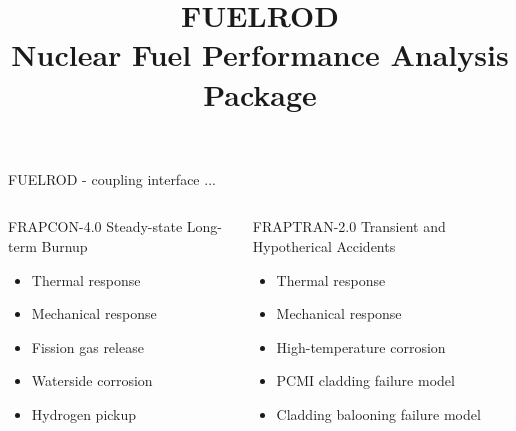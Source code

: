 \documentclass[11pt]{beamer}
\title{FUELROD \\ Nuclear Fuel Performance Analysis Package}
\institute{UNIST Core}
\begin{document}
\titlepage

\begin{frame}{FUELROD}
\scriptsize
   - coupling interface ...

  \begin{columns}


  \begin{block}{FRAPCON-4.0}
   Steady-state Long-term Burnup
   \begin{itemize}
   \item Thermal response
   \item Mechanical response
   \item Fission gas release
   \item Waterside corrosion
   \item Hydrogen pickup
   \end{itemize}
  \end{block}


  \begin{block}{FRAPTRAN-2.0}
   Transient and Hypotherical Accidents
   \begin{itemize}
   \item Thermal response
   \item Mechanical response
   \item High-temperature corrosion
   \item PCMI cladding failure model
   \item Cladding balooning failure model
   \end{itemize}
  \end{block}
  
  \end{columns}

\end{frame}
\end{document}
